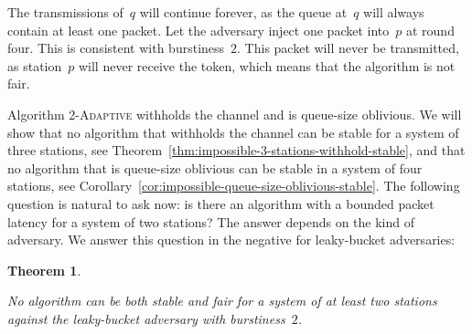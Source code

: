 \documentclass[11pt]{article}
\newtheorem{theorem}{Theorem}
\begin{document}
The transmissions of~$q$ will continue forever, as the queue at~$q$ will always contain at least one packet.
Let the adversary inject one packet into~$p$ at round four.
This is consistent with burstiness~$2$.
This packet will never be transmitted, as station~$p$ will never receive the token, which means that the algorithm is not fair.

Algorithm \textsc{2-Adaptive} withholds the channel and is queue-size oblivious.
We will show that no algorithm that withholds the channel can be stable for a system of three stations, see Theorem~\ref{thm:impossible-3-stations-withhold-stable}, and that no algorithm that is queue-size oblivious can be stable in a system of four stations, see Corollary~\ref{cor:impossible-queue-size-oblivious-stable}.
The following question is natural to ask now: is there an algorithm with a bounded packet latency for a system of two stations?
The answer depends on the kind of adversary.
We answer this question in the negative for leaky-bucket adversaries:





\begin{theorem}
\label{thm:2-impossible-fair-stable}

No algorithm can be both stable and fair for a system of at least two stations against the leaky-bucket adversary with burstiness~$2$.
\end{theorem}
\end{document}
